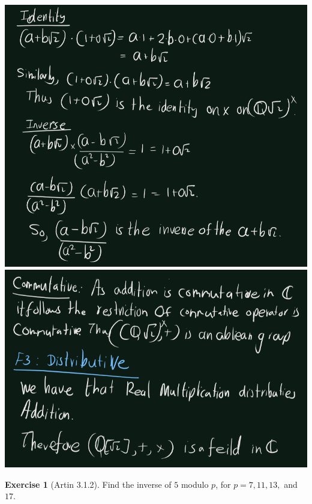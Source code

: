 \documentclass[
]{book}
\theoremstyle{definition}
\theoremstyle{definition}
\theoremstyle{definition}
\newtheorem{exercise}{Exercise}[chapter]
\theoremstyle{definition}
\theoremstyle{remark}
\begin{document}
\includegraphics{figures/ch_3/ex-1.1-3.png}
\includegraphics{figures/ch_3/ex-1.1-4.png}

\begin{exercise}[Artin 3.1.2]
\protect\hypertarget{exr:unnamed-chunk-253}{}\label{exr:unnamed-chunk-253}Find the inverse of \(5\) modulo \(p\), for \(p= 7, 11, 13,\) and \(17\).
\end{exercise}
\end{document}
